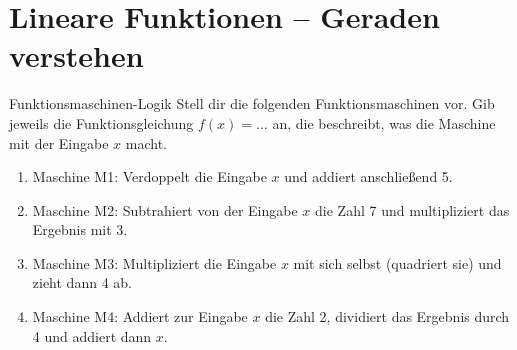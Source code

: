 \section{Lineare Funktionen – Geraden verstehen}
\label{sec:lineare_funktionen_ueberarbeitet}

\begin{aufgabenumgebung}{Funktionsmaschinen-Logik}{}
Stell dir die folgenden Funktionsmaschinen vor. Gib jeweils die Funktionsgleichung $f(x) = \dots$ an, die beschreibt, was die Maschine mit der Eingabe $x$ macht.
\begin{enumerate}
    \item Maschine M1: Verdoppelt die Eingabe $x$ und addiert anschließend 5.
    \item Maschine M2: Subtrahiert von der Eingabe $x$ die Zahl 7 und multipliziert das Ergebnis mit 3.
    \item Maschine M3: Multipliziert die Eingabe $x$ mit sich selbst (quadriert sie) und zieht dann 4 ab.
    \item Maschine M4: Addiert zur Eingabe $x$ die Zahl 2, dividiert das Ergebnis durch 4 und addiert dann $x$.
\end{enumerate}
\end{aufgabenumgebung}


